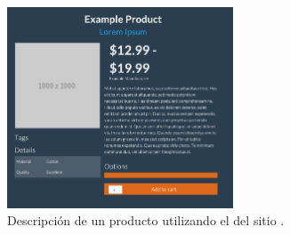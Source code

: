 \begin{figure}[H]
	\centering
	\includegraphics[width=0.6\textwidth]{figuras/bootstrap/bootstrap_theme_superhero.png}

	\caption{Descripción de un producto utilizando el \themeCPT \textbf{\themeSuperHero} del sitio \bootswatchNAME.}
	\label{figure:bootstrap:theme_superhero}
\end{figure}

